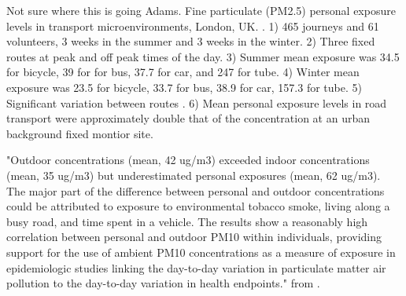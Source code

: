 Not sure where  this is going
 Adams. Fine particulate (PM2.5) personal exposure levels in transport microenvironments, London, UK. \cite{Adams2001}. 1) 465 journeys and 61 volunteers, 3 weeks in the summer and 3 weeks in the winter. 2) Three fixed routes at peak and off peak times of the day. 3) Summer mean exposure was 34.5 for bicycle, 39 for for bus, 37.7 for car, and 247 for tube. 4) Winter mean exposure was 23.5 for bicycle, 33.7 for bus, 38.9 for car, 157.3 for tube. 5) Significant variation between routes . 6) Mean personal exposure levels in road transport were approximately double that of the concentration at an urban background fixed montior site.
 
"Outdoor concentrations (mean, 42 ug/m3) exceeded indoor concentrations (mean, 35 ug/m3) but underestimated personal exposures (mean, 62 ug/m3). The major part of the difference between personal and outdoor concentrations could be attributed to exposure to environmental tobacco smoke, living along a busy road, and time spent in a vehicle. The results show a reasonably high correlation between personal and outdoor PM10 within individuals, providing support for the use of ambient PM10 concentrations as a measure of exposure in epidemiologic studies linking the day-to-day variation in particulate matter air pollution to the day-to-day variation in health endpoints." from \cite{Janssen1998}.
